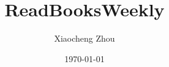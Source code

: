 \documentclass[working]{article}
\title{ReadBooksWeekly}
\author{Xiaocheng Zhou}
\date{\today}
\begin{document}
\maketitle


\listnotes

\end{document}
